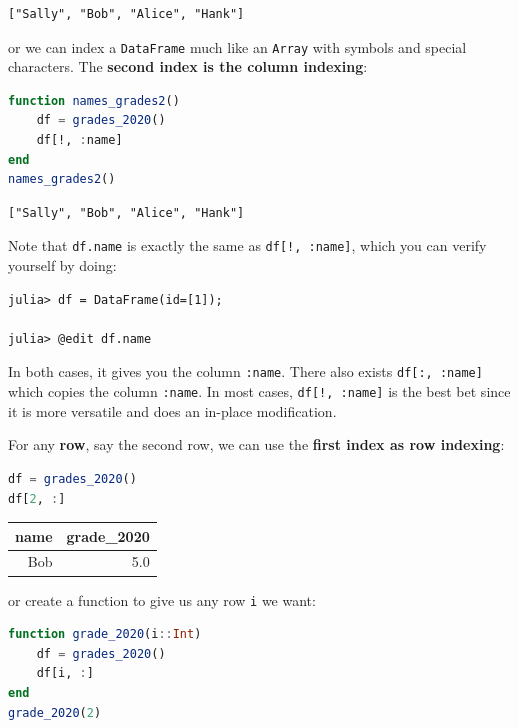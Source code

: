 \documentclass[
  notoc %
]{tufte-book}
\newcommand{\passthrough}[1]{#1}
\begin{document}
\begin{lstlisting}[language=Output]
["Sally", "Bob", "Alice", "Hank"]
\end{lstlisting}

or we can index a \passthrough{\lstinline!DataFrame!} much like an
\passthrough{\lstinline!Array!} with symbols and special characters. The
\textbf{second index is the column indexing}:

\begin{lstlisting}[language=Julia]
function names_grades2()
    df = grades_2020()
    df[!, :name]
end
names_grades2()
\end{lstlisting}

\begin{lstlisting}[language=Output]
["Sally", "Bob", "Alice", "Hank"]
\end{lstlisting}

Note that \passthrough{\lstinline!df.name!} is exactly the same as
\passthrough{\lstinline"df[!, :name]"}, which you can verify yourself by
doing:

\begin{lstlisting}
julia> df = DataFrame(id=[1]);

julia> @edit df.name
\end{lstlisting}

In both cases, it gives you the column \passthrough{\lstinline!:name!}.
There also exists \passthrough{\lstinline!df[:, :name]!} which copies
the column \passthrough{\lstinline!:name!}. In most cases,
\passthrough{\lstinline"df[!, :name]"} is the best bet since it is more
versatile and does an in-place modification.

For any \textbf{row}, say the second row, we can use the \textbf{first
index as row indexing}:

\begin{lstlisting}[language=Julia]
df = grades_2020()
df[2, :]
\end{lstlisting}

\begin{longtable}[]{@{}rr@{}}
\toprule
name & grade\_2020 \\
\midrule
\endhead
Bob & 5.0 \\
\bottomrule
\end{longtable}

or create a function to give us any row \passthrough{\lstinline!i!} we
want:

\begin{lstlisting}[language=Julia]
function grade_2020(i::Int)
    df = grades_2020()
    df[i, :]
end
grade_2020(2)
\end{lstlisting}
\end{document}
